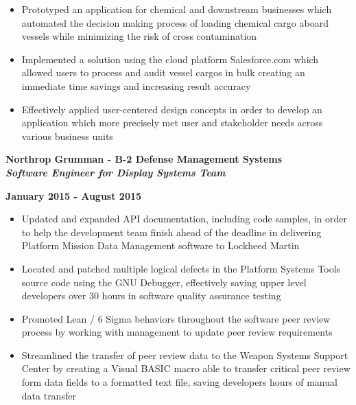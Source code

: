 \documentclass[10pt,letterpaper]{article}
\begin{document}
\begin{itemize}[noitemsep,topsep=0pt]
        \setlength\itemsep{-0.10em}
        \item Prototyped an application for chemical and downstream
              businesses which automated the decision making process of
              loading chemical cargo aboard vessels while minimizing the
              risk of cross contamination
        \item Implemented a solution using the cloud platform
              Salesforce.com which allowed users to process and audit
              vessel cargos in bulk creating an immediate time savings and
              increasing result accuracy
        \item Effectively applied user-centered design concepts in
              order to develop an application which more precisely met
              user and stakeholder needs across various business units

\end{itemize}

\medskip

\begin{minipage}[t]{0.53\textwidth}
        \begin{flushleft}
                \textbf{Northrop Grumman - B-2 Defense Management Systems}\\
                \textbf{\textit{Software Engineer for Display Systems Team}}\\
        \end{flushleft}
\end{minipage}
\begin{minipage}[t]{0.44\textwidth}
        \begin{flushright}
                \textbf{January 2015 - August 2015}
        \end{flushright}
\end{minipage}

\begin{itemize}[noitemsep,topsep=0pt]
        \setlength\itemsep{-0.10em}
        \item Updated and expanded API documentation, including code
              samples, in order to help the development team finish ahead
              of the deadline in delivering Platform Mission Data
              Management software to Lockheed Martin
        \item Located and patched multiple logical defects in the
              Platform Systems Tools source code using the GNU Debugger,
              effectively saving upper level developers over 30 hours in
              software quality assurance testing
        \item Promoted Lean / 6 Sigma behaviors throughout the
              software peer review process by working with management to
              update peer review requirements
        \item Streamlined the transfer of peer review data to the
              Weapon Systems Support Center by creating a Visual BASIC
              macro able to transfer critical peer review form data fields
              to a formatted text file, saving developers hours of manual
              data transfer
\end{itemize}
\end{document}
